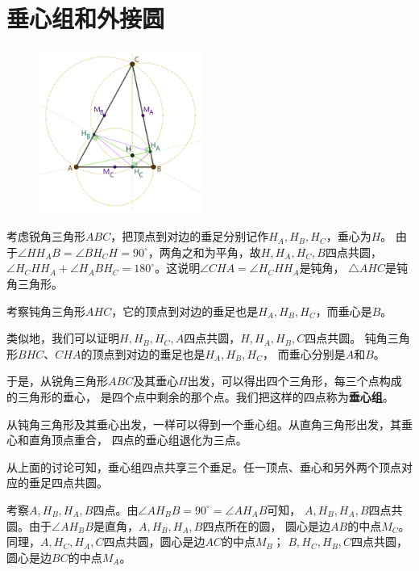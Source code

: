 \documentclass[12pt,UTF8]{ctexbook}
\begin{document}
\section{垂心组和外接圆}

\begin{figure} %
    \vspace{-90pt}
    \flushright
    \includegraphics[width=0.48\textwidth]{垂心与外心1.png}
\end{figure}

考虑锐角三角形$ABC$，把顶点到对边的垂足分别记作$H_A, H_B, H_C$，垂心为$H$。
由于$\angle HH_AB = \angle BH_CH = 90^\circ$，两角之和为平角，故$H, H_A, H_C, B$四点共圆，
$\angle H_CHH_A + \angle H_ABH_C = 180^\circ$。这说明$\angle CHA = \angle H_CHH_A$是钝角，
$\triangle AHC$是钝角三角形。

考察钝角三角形$AHC$，它的顶点到对边的垂足也是$H_A, H_B, H_C$，而垂心是$B$。

类似地，我们可以证明$H, H_B, H_C, A$四点共圆，$H, H_A, H_B, C$四点共圆。
钝角三角形$BHC$、$CHA$的顶点到对边的垂足也是$H_A, H_B, H_C$，
而垂心分别是$A$和$B$。

于是，从锐角三角形$ABC$及其垂心$H$出发，可以得出四个三角形，每三个点构成的三角形的垂心，
是四个点中剩余的那个点。我们把这样的四点称为\textbf{垂心组}。

从钝角三角形及其垂心出发，一样可以得到一个垂心组。从直角三角形出发，其垂心和直角顶点重合，
四点的垂心组退化为三点。

从上面的讨论可知，垂心组四点共享三个垂足。任一顶点、垂心和另外两个顶点对应的垂足四点共圆。

考察$A, H_B, H_A, B$四点。由$\angle AH_BB = 90^\circ = \angle AH_AB$可知，
$A, H_B, H_A, B$四点共圆。由于$\angle AH_BB$是直角，$A, H_B, H_A, B$四点所在的圆，
圆心是边$AB$的中点$M_C$。同理，$A, H_C, H_A, C$四点共圆，圆心是边$AC$的中点$M_B$；
$B, H_C, H_B, C$四点共圆，圆心是边$BC$的中点$M_A$。
\end{document}
